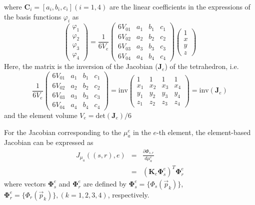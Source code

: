 \documentclass[12pt]{book}               %
\begin{document}
where $\mathbf{C}_i = [a_i,b_i,c_i] (i=1,4)$ are the linear coefficients in the expressions of the basis functions $\varphi_i$ as
\begin{equation}
\left(
\begin{array}{l}
\varphi_1\\
\varphi_2\\
\varphi_3\\
\varphi_4
\end{array}\right)=\frac{1}{6V_e}\left(
\begin{array}{llll}
6V_{01} & a_1 & b_1 & c_1 \\
6V_{02} & a_2 & b_2 & c_2 \\
6V_{03} & a_3 & b_3 & c_3 \\
6V_{04} & a_4 & b_4 & c_4 
\end{array}
\right)\left(
\begin{array}{l}
1\\
x\\
y\\
z
\end{array}\right)
\end{equation}
Here, the matrix is the inversion of the Jacobian ($\mathbf{J}_e$) of the tetrahedron, i.e.
\begin{equation}\frac{1}{6V_e}
\left(
\begin{array}{llll}
6V_{01} & a_1 & b_1 & c_1 \\
6V_{02} & a_2 & b_2 & c_2 \\
6V_{03} & a_3 & b_3 & c_3 \\
6V_{04} & a_4 & b_4 & c_4 
\end{array}
\right)=\textrm{inv}\left(
\begin{array}{llll}
1 & 1 & 1 & 1 \\
x_1 & x_2 & x_3 & x_4 \\
y_1 & y_2 & y_3 & y_4 \\
z_1 & z_2 & z_3 & z_4  
\end{array}
\right)=\textrm{inv}(\mathbf{J}_e)
\end{equation}
and the element volume $V_e=\textrm{det}(\mathbf{J}_e)/6$

For the Jacobian corresponding to the $\mu_a^e$ in the $e$-th element, the 
element-based Jacobian can be expressed as
\begin{eqnarray}\nonumber
J_{\mu_a}((s,r),e)&=&\frac{\partial
\Phi_{s,r}}{d\mu_a^{e}}\\&=&\left(\mathbf{K}_e{\boldsymbol\Phi}_s^e\right)^T{\boldsymbol\Phi}_r^e
\end{eqnarray}
where vectors $\boldsymbol{\Phi}_s^e$ and $\boldsymbol{\Phi}_r^e$
are defined by $\boldsymbol{\Phi}_s^e=\{\Phi_s(\vec{p}_k)\}$,
$\boldsymbol{\Phi}_r^e=\{\Phi_r(\vec{p}_k)\}, (k=1,2,3,4)$,
respectively.
\end{document}
